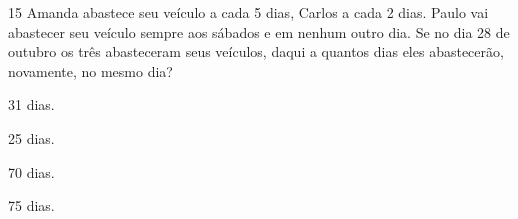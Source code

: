 




\num{15} Amanda abastece seu veículo a cada 5 dias, Carlos a cada 2 dias.
Paulo vai abastecer seu veículo sempre aos sábados e em nenhum outro
dia. Se no dia 28 de outubro os três abasteceram seus veículos, daqui a
quantos dias eles abastecerão, novamente, no mesmo dia?

\begin{escolha}
\item 31 dias.
\item 25 dias.
\item 70 dias.
\item 75 dias.
\end{escolha}






